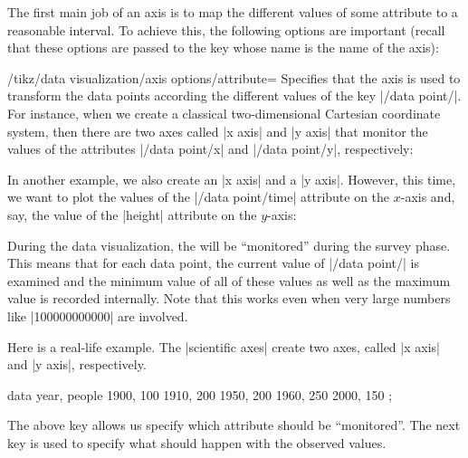 The first main job of an axis is to map the different values of some
attribute to a reasonable interval. To achieve this, the following
options are important (recall that these options are passed to the key
whose name is the name of the axis):

\begin{key}{/tikz/data visualization/axis options/attribute=}
  Specifies that the axis is used to transform the data points
  according the different values of the key
  |/data point/|. For instance, when we create a
  classical two-dimensional Cartesian coordinate system, then there
  are two axes called |x axis| and |y axis| that monitor the values of
  the attributes |/data point/x| and |/data point/y|, respectively:
\begin{codeexample}
\end{codeexample}
  In another example, we also create an |x axis| and a
  |y axis|. However, this time, we want to plot the values of the
  |/data point/time| attribute on the $x$-axis and, say, the value of
  the |height| attribute on the $y$-axis:
\begin{codeexample}
\end{codeexample}
  During the data visualization, the  will be
  ``monitored'' during the survey phase. This means that for each data
  point, the current value of |/data point/| is
  examined and the minimum value of all of these values as well as the
  maximum value is recorded internally. Note that this works even when
  very large numbers like |100000000000| are involved.

  Here is a real-life example. The |scientific axes| create two axes,
  called |x axis| and |y axis|, respectively.
\begin{codeexample}[]
\tikz \datavisualization [scientific axes,
                          x axis={attribute=people, length=2.5cm, ticks=few},
                          y axis={attribute=year},
                          visualize as scatter]
  data {
    year, people
    1900, 100
    1910, 200
    1950, 200
    1960, 250
    2000, 150
  };
\end{codeexample}
\end{key}

The above key allows us specify which attribute should be
``monitored''. The next key is used to specify what should happen with
the observed values.

